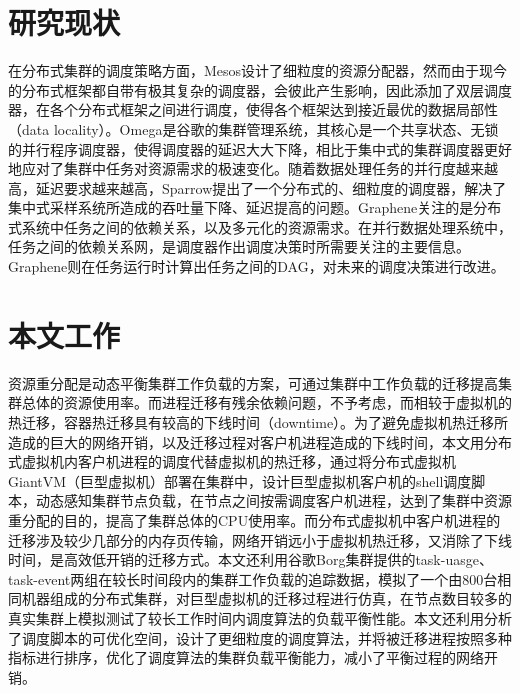 \section{研究现状}
\label{chap:dissch}
在分布式集群的调度策略方面，Mesos\cite{mesos}设计了细粒度的资源分配器，然而由于现今的分布式框架都自带有极其复杂的调度器，会彼此产生影响，因此添加了双层调度器，在各个分布式框架之间进行调度，使得各个框架达到接近最优的数据局部性（data locality）。Omega\cite{omega}是谷歌的集群管理系统，其核心是一个共享状态、无锁的并行程序调度器，使得调度器的延迟大大下降，相比于集中式的集群调度器更好地应对了集群中任务对资源需求的极速变化。随着数据处理任务的并行度越来越高，延迟要求越来越高，Sparrow\cite{sparrow}提出了一个分布式的、细粒度的调度器，解决了集中式采样系统所造成的吞吐量下降、延迟提高的问题。Graphene\cite{graphene}关注的是分布式系统中任务之间的依赖关系，以及多元化的资源需求。在并行数据处理系统中，任务之间的依赖关系网，是调度器作出调度决策时所需要关注的主要信息。Graphene则在任务运行时计算出任务之间的DAG，对未来的调度决策进行改进。

\section{本文工作}
资源重分配是动态平衡集群工作负载的方案，可通过集群中工作负载的迁移提高集群总体的资源使用率。而进程迁移有残余依赖问题，不予考虑，而相较于虚拟机的热迁移，容器热迁移具有较高的下线时间（downtime）。为了避免虚拟机热迁移所造成的巨大的网络开销，以及迁移过程对客户机进程造成的下线时间，本文用分布式虚拟机内客户机进程的调度代替虚拟机的热迁移，通过将分布式虚拟机GiantVM（巨型虚拟机）部署在集群中，设计巨型虚拟机客户机的shell调度脚本，动态感知集群节点负载，在节点之间按需调度客户机进程，达到了集群中资源重分配的目的，提高了集群总体的CPU使用率。而分布式虚拟机中客户机进程的迁移涉及较少几部分的内存页传输，网络开销远小于虚拟机热迁移，又消除了下线时间，是高效低开销的迁移方式。本文还利用谷歌Borg集群提供的task-uasge、task-event两组在较长时间段内的集群工作负载的追踪数据，模拟了一个由800台相同机器组成的分布式集群，对巨型虚拟机的迁移过程进行仿真，在节点数目较多的真实集群上模拟测试了较长工作时间内调度算法的负载平衡性能。本文还利用分析了调度脚本的可优化空间，设计了更细粒度的调度算法，并将被迁移进程按照多种指标进行排序，优化了调度算法的集群负载平衡能力，减小了平衡过程的网络开销。


